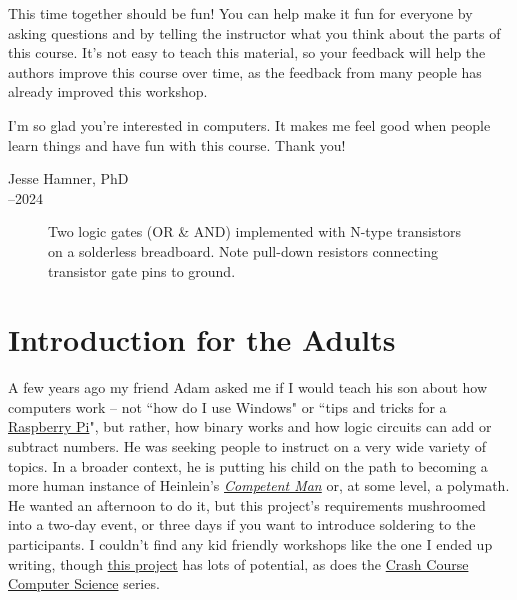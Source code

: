 This time together should be fun! You can help make it fun for everyone by asking questions and by telling the instructor what you think about the parts of this course. It's not easy to teach this material, so your feedback will help the authors improve this course over time, as the feedback from many people has already improved this workshop.

I'm so glad you're interested in computers. It makes me feel good when people learn things and have fun with this course. Thank you!
\bigskip

\noindent Jesse Hamner, PhD\\
--2024\\


\begin{figure}[!hb]
\begin{center}
\medskip
\caption{Two logic gates (OR \& AND) implemented with N-type transistors on a solderless breadboard. Note pull-down resistors connecting transistor gate pins to ground.}
\end{center}
\end{figure}



\section{Introduction for the Adults}

A few years ago my friend Adam asked me if I would teach his son about how computers work -- not ``how do I use Windows" or ``tips and tricks for a {\color{webblue}\href{https://www.raspberrypi.org}{Raspberry Pi}}", but rather, how binary works and how logic circuits can add or subtract numbers. He was seeking people to instruct on a very wide variety of topics. In a broader context, he is putting his child on the path to becoming a more human instance of Heinlein's {\color{webblue}\href{https://en.wikipedia.org/wiki/Competent_man}{\emph{Competent Man}}} or, at some level, a polymath. He wanted an afternoon to do it, but this project's requirements mushroomed into a two-day event, or three days if you want to introduce soldering to the participants. I couldn't find any kid friendly workshops like the one I ended up writing, though {\color{webblue}\href{https://www.raspberrypi.org/blog/digital-making-curriculum/}{this project}} has lots of potential, as does the {\color{webblue}\href{https://www.youtube.com/playlist?list=PLME-KWdxI8dcaHSzzRsNuOLXtM2Ep_C7a}{Crash Course Computer Science}} series. 

